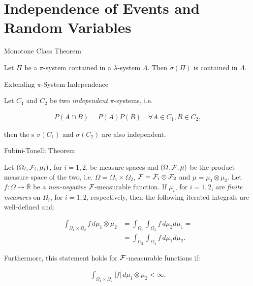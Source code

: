 
\section{Independence of Events and Random Variables}

\begin{theorem}{6.3}{Monotone Class Theorem}

    Let $\Pi$ be a $\pi$-system contained in a $\lambda$-system $\Lambda$. Then $\sigma(\Pi)$ is contained in $\Lambda$.

\end{theorem}

\begin{proposition}{6.4}{Extending $\pi$-System Independence}

    Let $C_1$ and $C_2$ be two \emph{independent} $\pi$-systems, i.e.

        \begin{align*}
            P(A \cap B) = P(A)P(B) \quad \forall A \in C_1, B \in C_2,
        \end{align*}

    then the \SigmaAlgebra s $\sigma(C_1)$ and $\sigma(C_2)$ are also independent.

\end{proposition}

\begin{theorem}{6.7}{Fubini-Tonelli Theorem}

    Let $(\Omega_i, \mathcal{F}_i, \mu_i)$, for $i = 1,2$, be measure spaces and $(\Omega, \mathcal{F}, \mu)$ be the product measure space of the two, i.e. $\Omega = \Omega_1 \times \Omega_2$, $\mathcal{F} = \mathcal{F}_i \otimes \mathcal{F}_2$ and $\mu = \mu_1 \otimes \mu_2$. Let $f: \Omega \to \overline{\mathbb{R}}$ be a \emph{non-negative} $\mathcal{F}$-measurable function. If $\mu_i$, for $i = 1,2$, are \emph{finite measures} on $\Omega_i$, for $i = 1,2$, respectively, then the following iterated integrals are well-defined and:

        \begin{align*}
            \int_{\Omega_1 \times \Omega_2} f \, d\mu_1 \otimes \mu_2 &= \int_{\Omega_1} \int_{\Omega_2} f \, d\mu_2 d\mu_1 = \\ &= \int_{\Omega_2} \int_{\Omega_1} f \, d\mu_1 d\mu_2.
        \end{align*}

    Furthermore, this statement holds for $\mathcal{F}$-measurable functions if:

        \begin{align*}
            \int_{\Omega_1 \times \Omega_2} |f| \, d\mu_1 \otimes \mu_2 < \infty.
        \end{align*}

\end{theorem}

